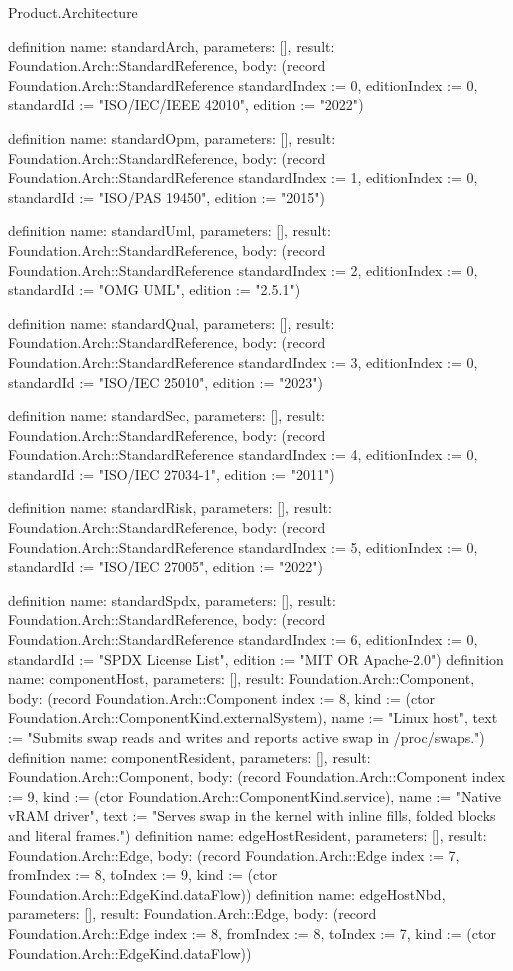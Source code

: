\begin{lexlean}{Product.Architecture}
\begin{semanticmodule}
definition{
  name: standardArch, parameters: [], result: Foundation.Arch::StandardReference,
  body: (record Foundation.Arch::StandardReference {standardIndex := 0, editionIndex := 0, standardId := "ISO/IEC/IEEE 42010", edition := "2022"})
}

definition{
  name: standardOpm, parameters: [], result: Foundation.Arch::StandardReference,
  body: (record Foundation.Arch::StandardReference {standardIndex := 1, editionIndex := 0, standardId := "ISO/PAS 19450", edition := "2015"})
}

definition{
  name: standardUml, parameters: [], result: Foundation.Arch::StandardReference,
  body: (record Foundation.Arch::StandardReference {standardIndex := 2, editionIndex := 0, standardId := "OMG UML", edition := "2.5.1"})
}

definition{
  name: standardQual, parameters: [], result: Foundation.Arch::StandardReference,
  body: (record Foundation.Arch::StandardReference {standardIndex := 3, editionIndex := 0, standardId := "ISO/IEC 25010", edition := "2023"})
}

definition{
  name: standardSec, parameters: [], result: Foundation.Arch::StandardReference,
  body: (record Foundation.Arch::StandardReference {standardIndex := 4, editionIndex := 0, standardId := "ISO/IEC 27034-1", edition := "2011"})
}

definition{
  name: standardRisk, parameters: [], result: Foundation.Arch::StandardReference,
  body: (record Foundation.Arch::StandardReference {standardIndex := 5, editionIndex := 0, standardId := "ISO/IEC 27005", edition := "2022"})
}

definition{
  name: standardSpdx, parameters: [], result: Foundation.Arch::StandardReference,
  body: (record Foundation.Arch::StandardReference {standardIndex := 6, editionIndex := 0, standardId := "SPDX License List", edition := "MIT OR Apache-2.0"})
}
definition{
  name: componentHost, parameters: [], result: Foundation.Arch::Component,
  body: (record Foundation.Arch::Component {index := 8, kind := (ctor Foundation.Arch::ComponentKind.externalSystem), name := "Linux host", text := "Submits swap reads and writes and reports active swap in /proc/swaps."})
}
definition{
  name: componentResident, parameters: [], result: Foundation.Arch::Component,
  body: (record Foundation.Arch::Component {index := 9, kind := (ctor Foundation.Arch::ComponentKind.service), name := "Native vRAM driver", text := "Serves swap in the kernel with inline fills, folded blocks and literal frames."})
}
definition{
  name: edgeHostResident, parameters: [], result: Foundation.Arch::Edge,
  body: (record Foundation.Arch::Edge {index := 7, fromIndex := 8, toIndex := 9, kind := (ctor Foundation.Arch::EdgeKind.dataFlow)})
}
definition{
  name: edgeHostNbd, parameters: [], result: Foundation.Arch::Edge,
  body: (record Foundation.Arch::Edge {index := 8, fromIndex := 8, toIndex := 7, kind := (ctor Foundation.Arch::EdgeKind.dataFlow)})
}
\end{semanticmodule}
\end{lexlean}
